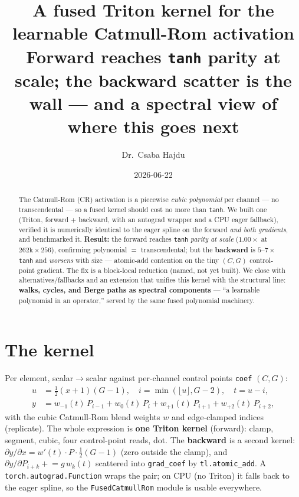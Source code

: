 \documentclass[11pt]{article}
\title{\textbf{A fused Triton kernel for the learnable Catmull-Rom activation}\\[2pt]
  \large Forward reaches \texttt{tanh} parity at scale; the backward scatter is the wall --- and a spectral
  view of where this goes next}
\author{Dr.\ Csaba Hajdu}
\date{2026-06-22}
\newcommand{\code}[1]{\texttt{\small #1}}
\begin{document}
\maketitle

\begin{abstract}\noindent
The Catmull-Rom (CR) activation is a piecewise \emph{cubic polynomial} per channel --- no transcendental --- so
a fused kernel should cost no more than \code{tanh}. We built one (Triton, forward + backward, with an
autograd wrapper and a CPU eager fallback), verified it is numerically identical to the eager spline on the
forward \emph{and both gradients}, and benchmarked it. \textbf{Result:} the forward reaches \code{tanh}
\emph{parity at scale} ($1.00\times$ at $262\text{k}\times256$), confirming polynomial $=$ transcendental; but
the \textbf{backward} is $5$--$7\times$ \code{tanh} and \emph{worsens} with size --- atomic-add contention on
the tiny $(C,G)$ control-point gradient. The fix is a block-local reduction (named, not yet built). We close
with alternatives/fallbacks and an extension that unifies this kernel with the structural line: \textbf{walks,
cycles, and Berge paths as spectral components} --- ``a learnable polynomial in an operator,'' served by the
same fused polynomial machinery.
\end{abstract}

\section{The kernel}
Per element, scalar$\to$scalar against per-channel control points \code{coef} $(C,G)$:
\begin{align*}
u &= \tfrac{1}{2}(x+1)(G-1),\quad i=\min(\lfloor u\rfloor, G{-}2),\quad t=u-i,\\
y &= w_{-1}(t)\,P_{i-1} + w_0(t)\,P_i + w_{+1}(t)\,P_{i+1} + w_{+2}(t)\,P_{i+2},
\end{align*}
with the cubic Catmull-Rom blend weights $w$ and edge-clamped indices (replicate). The whole expression is
\textbf{one Triton kernel} (forward): clamp, segment, cubic, four control-point reads, dot. The \textbf{backward}
is a second kernel: $\partial y/\partial x = w'(t)\!\cdot\!P\cdot\tfrac12(G{-}1)$ (zero outside the clamp), and
$\partial y/\partial P_{i+k} \mathrel{+}= g\,w_k(t)$ scattered into \code{grad\_coef} by \code{tl.atomic\_add}.
A \code{torch.autograd.Function} wraps the pair; on CPU (no Triton) it falls back to the eager spline, so the
\code{FusedCatmullRom} module is usable everywhere.
\end{document}
